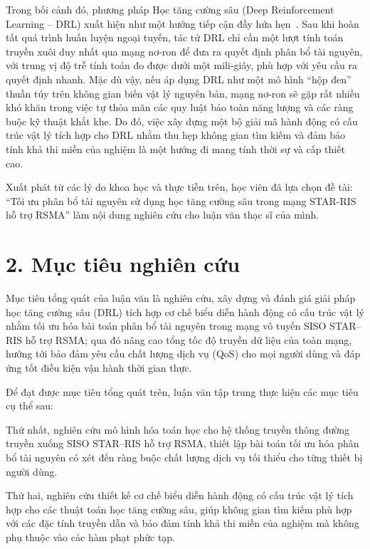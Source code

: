 Trong bối cảnh đó, phương pháp Học tăng cường sâu (Deep Reinforcement Learning -- DRL) xuất hiện như một
hướng tiếp cận đầy hứa hẹn~\cite{Mnih2015DQN}. Sau khi hoàn tất quá trình huấn luyện ngoại tuyến, tác tử
DRL chỉ cần một lượt tính toán truyền xuôi duy nhất qua mạng nơ-ron để đưa ra quyết định phân bổ tài
nguyên, với trung vị độ trễ tính toán đo được dưới một mili-giây, phù hợp với yêu cầu ra quyết định
nhanh. Mặc dù vậy, nếu áp dụng DRL như một mô hình ``hộp đen'' thuần túy trên không gian biến vật lý
nguyên bản, mạng nơ-ron sẽ gặp rất nhiều khó khăn trong việc tự thỏa mãn các quy luật bảo toàn năng
lượng và các ràng buộc kỹ thuật khắt khe. Do đó, việc xây dựng một bộ giải mã hành động có cấu trúc vật
lý tích hợp cho DRL nhằm thu hẹp không gian tìm kiếm và đảm bảo tính khả thi miền của nghiệm là một
hướng đi mang tính thời sự và cấp thiết cao.

Xuất phát từ các lý do khoa học và thực tiễn trên, học viên đã lựa chọn đề tài: ``Tối ưu phân bổ tài
nguyên sử dụng học tăng cường sâu trong mạng STAR-RIS hỗ trợ RSMA'' làm nội dung nghiên cứu cho luận
văn thạc sĩ của mình.

\section*{2. Mục tiêu nghiên cứu}

Mục tiêu tổng quát của luận văn là nghiên cứu, xây dựng và đánh giá giải pháp học tăng cường sâu (DRL)
tích hợp cơ chế biểu diễn hành động có cấu trúc vật lý nhằm tối ưu hóa bài toán phân bổ tài nguyên
trong mạng vô tuyến SISO STAR--RIS hỗ trợ RSMA; qua đó nâng cao tổng tốc độ truyền dữ liệu của toàn
mạng, hướng tới bảo đảm yêu cầu chất lượng dịch vụ (QoS) cho mọi người dùng và đáp ứng tốt điều kiện vận
hành thời gian thực.

Để đạt được mục tiêu tổng quát trên, luận văn tập trung thực hiện các mục tiêu cụ thể sau:

Thứ nhất, nghiên cứu mô hình hóa toán học cho hệ thống truyền thông đường truyền xuống SISO STAR--RIS
hỗ trợ RSMA, thiết lập bài toán tối ưu hóa phân bổ tài nguyên có xét đến ràng buộc chất lượng dịch vụ tối
thiểu cho từng thiết bị người dùng.

Thứ hai, nghiên cứu thiết kế cơ chế biểu diễn hành động có cấu trúc vật lý tích hợp cho các thuật toán
học tăng cường sâu, giúp không gian tìm kiếm phù hợp với các đặc tính truyền dẫn và bảo đảm tính khả thi
miền của nghiệm mà không phụ thuộc vào các hàm phạt phức tạp.

